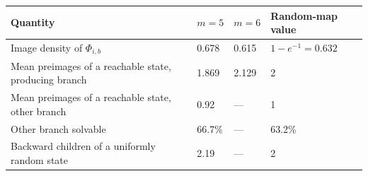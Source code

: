 \begin{tabularx}{\textwidth}{@{}>{\raggedright\arraybackslash}Xlll@{}}
\toprule
Quantity & $m=5$ & $m=6$ & Random-map value \\
\midrule
Image density of $\Phi_{i,b}$ & 0.678 & 0.615 & $1-e^{-1}=0.632$ \\
Mean preimages of a reachable state, producing branch & 1.869 & 2.129 & 2 \\
Mean preimages of a reachable state, other branch & 0.92 & --- & 1 \\
Other branch solvable & 66.7\% & --- & 63.2\% \\
Backward children of a uniformly random state & 2.19 & --- & 2 \\
\bottomrule
\end{tabularx}
